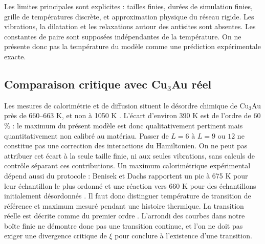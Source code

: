\documentclass[10pt,a4paper]{article}
\begin{document}
Les limites principales sont explicites : tailles finies, durées de
simulation finies, grille de températures discrète, et approximation physique
du réseau rigide. Les vibrations, la dilatation et les relaxations autour des
antisites sont absentes. Les constantes de paire sont supposées indépendantes
de la température. On ne présente donc pas la température du modèle comme
une prédiction expérimentale exacte.

\subsection{Comparaison critique avec \texorpdfstring{Cu$_3$Au}{Cu3Au} réel}
Les mesures de calorimétrie et de diffusion situent le désordre chimique de
Cu$_3$Au près de 660--663 K, et non à 1050 K
\cite{benisek,paras}. L'écart d'environ 390 K est de l'ordre de 60\,\% :
le maximum du présent modèle est donc qualitativement pertinent mais
quantitativement non calibré au matériau. Passer de $L=6$ à $L=9$ ou $12$ ne
constitue pas une correction des interactions du Hamiltonien. On ne peut
pas attribuer cet écart à la seule taille finie, ni aux seules vibrations,
sans calculs de contrôle séparant ces contributions.
Un maximum calorimétrique expérimental dépend aussi du protocole :
Benisek et Dachs rapportent un pic à 675 K pour leur échantillon le
plus ordonné et une réaction vers 660 K pour des échantillons initialement
désordonnés \cite{benisek}. Il faut donc distinguer température de
transition de référence et maximum mesuré pendant une histoire thermique.
La transition réelle est décrite comme du premier ordre
\cite{paras}. L'arrondi des courbes dans notre boîte finie ne démontre
donc pas une transition continue, et l'on ne doit pas exiger une divergence
critique de $\xi$ pour conclure à l'existence d'une transition.
\end{document}
